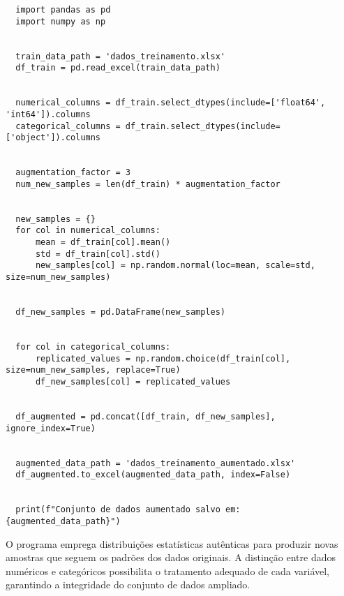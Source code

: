 \begin{lstlisting}
  import pandas as pd
  import numpy as np
  
  
  train_data_path = 'dados_treinamento.xlsx'  
  df_train = pd.read_excel(train_data_path)
  
  
  numerical_columns = df_train.select_dtypes(include=['float64', 'int64']).columns
  categorical_columns = df_train.select_dtypes(include=['object']).columns
  
  
  augmentation_factor = 3  
  num_new_samples = len(df_train) * augmentation_factor
  
  
  new_samples = {}
  for col in numerical_columns:
      mean = df_train[col].mean()
      std = df_train[col].std()
      new_samples[col] = np.random.normal(loc=mean, scale=std, size=num_new_samples)
  
  
  df_new_samples = pd.DataFrame(new_samples)
  
  
  for col in categorical_columns:
      replicated_values = np.random.choice(df_train[col], size=num_new_samples, replace=True)
      df_new_samples[col] = replicated_values
  
  
  df_augmented = pd.concat([df_train, df_new_samples], ignore_index=True)
  
  
  augmented_data_path = 'dados_treinamento_aumentado.xlsx'
  df_augmented.to_excel(augmented_data_path, index=False)
  
  
  print(f"Conjunto de dados aumentado salvo em: {augmented_data_path}")
\end{lstlisting}

O programa emprega distribuições estatísticas autênticas para produzir novas amostras que seguem os padrões dos dados originais. A distinção entre dados numéricos e categóricos possibilita o tratamento adequado de cada variável, garantindo a integridade do conjunto de dados ampliado.

